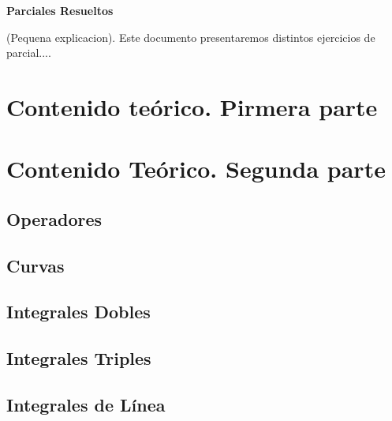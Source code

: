 \documentclass[10pt, a4paper]{report}
\theoremstyle{definition} %
\begin{document}
    \newpage

    \setcounter{page}{1}
    \begin{center}
        \textbf{ \noindent \textbf{Parciales Resueltos}}
    \end{center}
    \vspace{3cm}
      
    (Pequena explicacion).  Este documento presentaremos distintos ejercicios de parcial....
    \newpage

    \tableofcontents
        \setcounter{page}{1}

    \chapter{Contenido teórico. Pirmera parte}

    \chapter{Contenido Teórico. Segunda parte}
        \section{Operadores}
            
        \section{Curvas}
            
        \section{Integrales Dobles} 
            
        \section{Integrales Triples}
            
        \section{Integrales de L\'inea}
            
\end{document}
